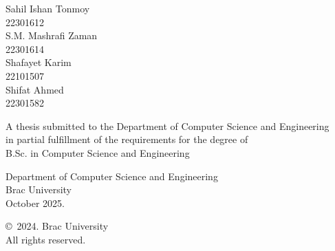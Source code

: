 \begin{titlepage}
\renewcommand*{\thepage}{Title} %

    \begin{center} 
        \vspace*{3cm} %
        
        {\fontsize{16pt}{22pt}\selectfont{P1 Report}
        } %
        
        \vspace{1.5cm}
        
        
        \vspace{0.5cm}
        
        	Sahil Ishan Tonmoy\\
	        22301612\\
	        S.M. Mashrafi Zaman\\
	        22301614\\
	        Shafayet Karim\\
	        22101507\\
	        Shifat Ahmed\\
	        22301582

        \vspace{1.5cm}
        
        	A thesis submitted to the Department of Computer Science and Engineering\\
            in partial fulfillment of the requirements for the degree of\\
            B.Sc. in Computer Science and Engineering

        
        \vspace{2.5cm}
        
    		Department of Computer Science and Engineering\\
            Brac University\\
            October 2025.
        
        \vspace{3cm}
        
    		\copyright\ 2024. Brac University\\
            All rights reserved.
    
    \end{center}

\end{titlepage}